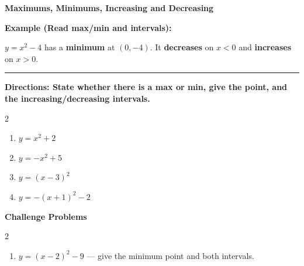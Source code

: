 \documentclass[12pt]{article}
\begin{document}
\vspace{0.35cm}

\begin{center}{\Large \textbf{Maximums, Minimums, Increasing and Decreasing}}\end{center}\vspace{0.25cm}
\textbf{Example (Read max/min and intervals):}

$y=x^{2}-4$ has a \textbf{minimum} at $(0,-4)$. It \textbf{decreases} on $x<0$ and \textbf{increases} on $x>0$.

\vspace{0.3cm}\hrule\vspace{0.4cm}
\textbf{Directions: State whether there is a max or min, give the point, and the increasing/decreasing intervals.}

\begin{multicols}{2}
\begin{enumerate}[label=\textbf{\arabic*.}, start=1, itemsep=3cm]
  \item $\displaystyle y=x^{2}+2$
  \item $\displaystyle y=-x^{2}+5$
  \item $\displaystyle y=(x-3)^{2}$
  \item $\displaystyle y=-(x+1)^{2}-2$
\end{enumerate}
\end{multicols}
\newpage

\begin{center}{\large \textbf{Challenge Problems}}\end{center}\vspace{0.3cm}
\begin{multicols}{2}\begin{enumerate}[label=\textbf{\arabic*.}, start=5, itemsep=2.6cm]
  \item $y=(x-2)^2-9$ — give the minimum point and both intervals.
\end{enumerate}\end{multicols}\newpage
\end{document}
